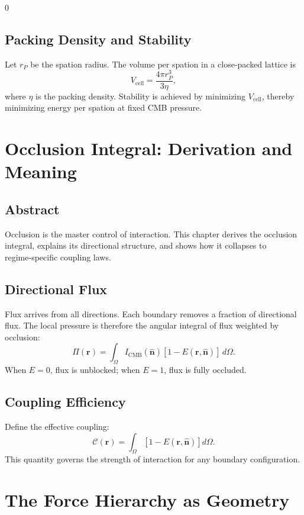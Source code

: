 0\documentclass[12pt]{book}
\begin{document}
\section{Packing Density and Stability}
Let $r_P$ be the spation radius. The volume per spation in a close‑packed lattice is
\begin{equation}
V_{\text{cell}} = \frac{4\pi r_P^3}{3\eta},
\end{equation}
where $\eta$ is the packing density. Stability is achieved by minimizing $V_{\text{cell}}$, thereby
minimizing energy per spation at fixed CMB pressure.

\chapter{Occlusion Integral: Derivation and Meaning}

\section*{Abstract}
Occlusion is the master control of interaction. This chapter derives the occlusion integral, explains its
directional structure, and shows how it collapses to regime‑specific coupling laws.

\section{Directional Flux}
Flux arrives from all directions. Each boundary removes a fraction of directional flux. The local pressure
is therefore the angular integral of flux weighted by occlusion:
\begin{equation}
\Pi(\mathbf{r}) = \int_{\Omega} I_{\text{CMB}}(\hat{\mathbf{n}})\left[1 - E(\mathbf{r},\hat{\mathbf{n}})\right]\, d\Omega.
\end{equation}
When $E = 0$, flux is unblocked; when $E = 1$, flux is fully occluded.

\section{Coupling Efficiency}
Define the effective coupling:
\begin{equation}
\mathcal{C}(\mathbf{r}) = \int_{\Omega}\left[1 - E(\mathbf{r},\hat{\mathbf{n}})\right] d\Omega.
\end{equation}
This quantity governs the strength of interaction for any boundary configuration.

\chapter{The Force Hierarchy as Geometry}
\end{document}
